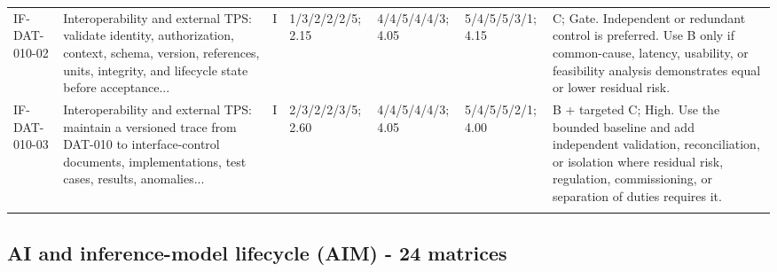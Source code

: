 \documentclass[11pt,letterpaper]{article}
\begin{document}
\begin{scriptsize}
\begin{longtable}{@{}L{0.11\textwidth}L{0.165\textwidth}L{0.04\textwidth}L{0.115\textwidth}L{0.115\textwidth}L{0.115\textwidth}L{0.235\textwidth}@{}}
\addlinespace[2pt]
IF-DAT-010-02 & Interoperability and external TPS: validate identity, authorization, context, schema, version, references, units, integrity, and lifecycle state before acceptance... & I & 1/3/2/2/2/5; 2.15 & 4/4/5/4/4/3; 4.05 & 5/4/5/5/3/1; 4.15 & C; Gate. Independent or redundant control is preferred. Use B only if common-cause, latency, usability, or feasibility analysis demonstrates equal or lower residual risk. \\
\addlinespace[2pt]
IF-DAT-010-03 & Interoperability and external TPS: maintain a versioned trace from DAT-010 to interface-control documents, implementations, test cases, results, anomalies... & I & 2/3/2/2/3/5; 2.60 & 4/4/5/4/4/3; 4.05 & 5/4/5/5/2/1; 4.00 & B + targeted C; High. Use the bounded baseline and add independent validation, reconciliation, or isolation where residual risk, regulation, commissioning, or separation of duties requires it. \\
\addlinespace[2pt]
\end{longtable}
\end{scriptsize}

\subsection{AI and inference-model lifecycle (AIM) - 24 matrices}
\end{document}
